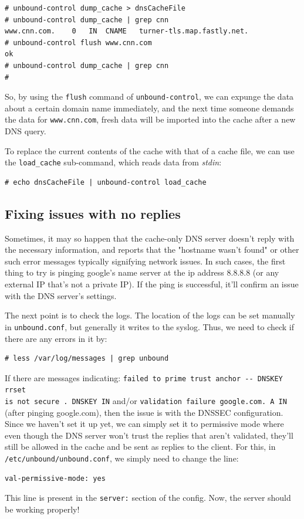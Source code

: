 \vspace{-15pt}
\begin{verbatim}
# unbound-control dump_cache > dnsCacheFile
# unbound-control dump_cache | grep cnn
www.cnn.com.	0	IN	CNAME	turner-tls.map.fastly.net.
# unbound-control flush www.cnn.com
ok
# unbound-control dump_cache | grep cnn
#
\end{verbatim}
\vspace{-10pt}	

\noindent
So, by using the \verb|flush| command of \verb|unbound-control|, we can expunge the data about a certain domain name immediately, and the next time someone demands the data for \verb|www.cnn.com|, fresh data will be imported into the cache after a new DNS query. 

To replace the current contents of the cache with that of a cache file, we can use the \verb|load_cache| sub-command, which reads data from \textit{stdin}:

\vspace{-15pt}
\begin{verbatim}
# echo dnsCacheFile | unbound-control load_cache
\end{verbatim}

\subsection{Fixing issues with no replies}
Sometimes, it may so happen that the cache-only DNS server doesn't reply with the necessary information, and reports that the "hostname wasn't found" or other such error messages typically signifying network issues. In such cases, the first thing to try is pinging google's name server at the ip address 8.8.8.8 (or any external IP that's not a private IP). If the ping is successful, it'll confirm an issue with the DNS server's settings. 

The next point is to check the logs. The location of the logs can be set manually in \verb|unbound.conf|, but generally it writes to the syslog. Thus, we need to check if there are any errors in it by:

\vspace{-15pt}
\begin{verbatim}
# less /var/log/messages | grep unbound
\end{verbatim}
\vspace{-10pt}	

\noindent
If there are messages indicating: \verb|failed to prime trust anchor -- DNSKEY rrset |\\ \verb|is not secure . DNSKEY IN| and/or \verb|validation failure google.com. A IN| (after pinging google.com), then the issue is with the DNSSEC configuration. Since we haven't set it up yet, we can simply set it to permissive mode where even though the DNS server won't trust the replies that aren't validated, they'll still be allowed in the cache and be sent as replies to the client. For this, in \verb|/etc/unbound/unbound.conf|, we simply need to change the line:

\vspace{-15pt}
\begin{verbatim}
val-permissive-mode: yes
\end{verbatim}
\vspace{-10pt}	

\noindent
This line is present in the \verb|server:| section of the config. Now, the server should be working properly!

